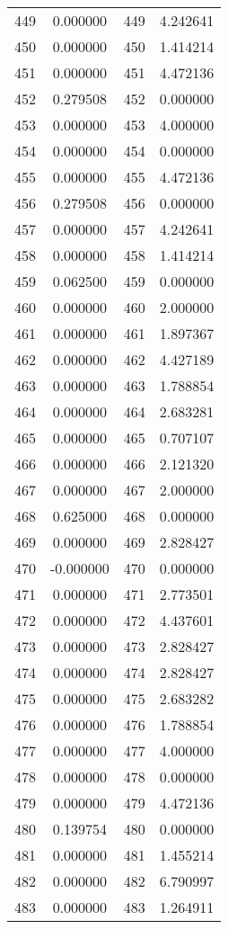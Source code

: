 \documentclass[12pt]{article}
\begin{document}
\begin{longtable}{@{}cccc@{}}
449 & 0.000000 & 449 & 4.242641 \\
450 & 0.000000 & 450 & 1.414214 \\
451 & 0.000000 & 451 & 4.472136 \\
452 & 0.279508 & 452 & 0.000000 \\
453 & 0.000000 & 453 & 4.000000 \\
454 & 0.000000 & 454 & 0.000000 \\
455 & 0.000000 & 455 & 4.472136 \\
456 & 0.279508 & 456 & 0.000000 \\
457 & 0.000000 & 457 & 4.242641 \\
458 & 0.000000 & 458 & 1.414214 \\
459 & 0.062500 & 459 & 0.000000 \\
460 & 0.000000 & 460 & 2.000000 \\
461 & 0.000000 & 461 & 1.897367 \\
462 & 0.000000 & 462 & 4.427189 \\
463 & 0.000000 & 463 & 1.788854 \\
464 & 0.000000 & 464 & 2.683281 \\
465 & 0.000000 & 465 & 0.707107 \\
466 & 0.000000 & 466 & 2.121320 \\
467 & 0.000000 & 467 & 2.000000 \\
468 & 0.625000 & 468 & 0.000000 \\
469 & 0.000000 & 469 & 2.828427 \\
470 & -0.000000 & 470 & 0.000000 \\
471 & 0.000000 & 471 & 2.773501 \\
472 & 0.000000 & 472 & 4.437601 \\
473 & 0.000000 & 473 & 2.828427 \\
474 & 0.000000 & 474 & 2.828427 \\
475 & 0.000000 & 475 & 2.683282 \\
476 & 0.000000 & 476 & 1.788854 \\
477 & 0.000000 & 477 & 4.000000 \\
478 & 0.000000 & 478 & 0.000000 \\
479 & 0.000000 & 479 & 4.472136 \\
480 & 0.139754 & 480 & 0.000000 \\
481 & 0.000000 & 481 & 1.455214 \\
482 & 0.000000 & 482 & 6.790997 \\
483 & 0.000000 & 483 & 1.264911 \\

\end{longtable}
\end{document}
